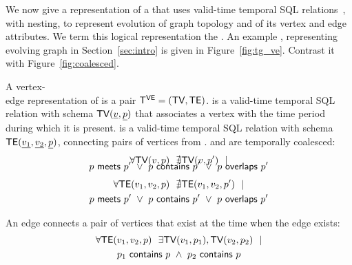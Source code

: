 We now give a representation of a \tg that uses valid-time temporal
SQL relations~\cite{DBLP:conf/vldb/BohlenSS96}, with nesting, to
represent evolution of graph topology and of its vertex and edge
attributes.  We term this logical representation the {\em \ve \tg}.
An example \ve \tg, representing evolving graph in
Section~\ref{sec:intro} is given in Figure~\ref{fig:tg_ve}.  Contrast
it with Figure~\ref{fig:coalesced}.

\vspace{-0.2cm}
\begin{definition}
A vertex-\\edge representation of \tg is a pair $\mathsf{T^{VE}}=(\textsf{TV}, \textsf{TE})$. \tv
is a valid-time temporal SQL relation with schema $\textsf{TV}(\underline{v},
\underline{p})$ that associates a vertex with the time period during
which it is present. \te is a valid-time temporal SQL relation with
schema $\textsf{TE}(\underline{v_1}, \underline{v_2}, \underline{p})$,
connecting pairs of vertices from \tv. \tv and \te are
temporally coalesced:
\vspace{-0.3cm}
\begin{multline}
\vspace{-0.3cm}
\forall \tv(v, p)~~\nexists \tv(v, p')~~| \\
                       \pred{p}{meets}{p'}~\lor~\pred{p}{contains}{p'}~\lor~\pred{p}{overlaps}{p'}
\label{def:tg:c2}
\end{multline}
\vspace{-0.7cm}
\begin{multline}
\forall \textsf{TE}(v_1, v_2, p)~~\nexists \textsf{TE}(v_1,v_2, p')~~| \\
                       p~\mathsf{meets}~p'~\lor~p~\mathsf{contains}~p'~\lor~p~\mathsf{overlaps}~p'
\label{def:tg:c3}
\end{multline}

An edge connects a pair of vertices that exist at the time when the edge exists:
\vspace{-0.3cm}
\begin{multline}
\forall \textsf{TE}(v_1, v_2, p)~~\exists \textsf{TV}(v_1, p_1), \textsf{TV}(v_2, p_2)~~| \\
                       p_1~\mathsf{contains}~p~\wedge~p_2~\mathsf{contains}~p
\label{def:tg:c1}
\end{multline}
\vspace{-0.5cm}


\end{definition}
